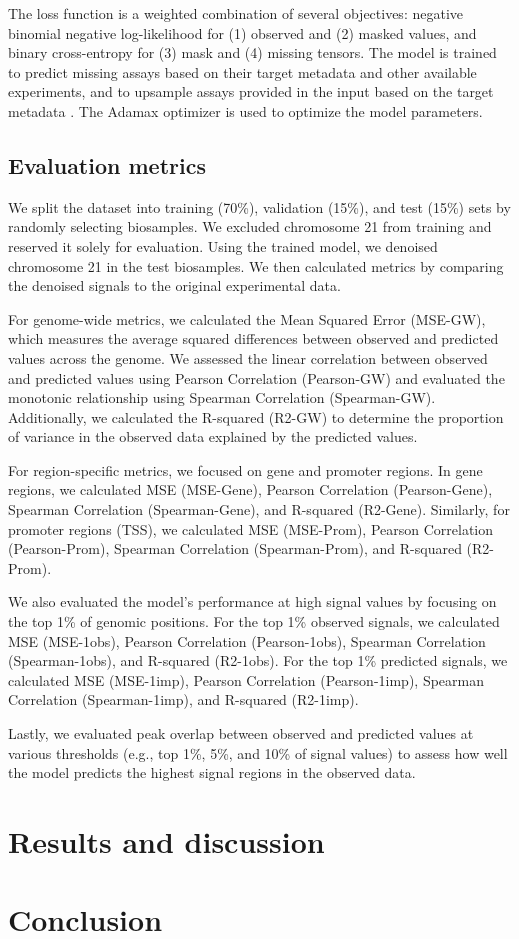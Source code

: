 \documentclass[twoside,11pt]{article}
\begin{document}
The loss function is a weighted combination of several objectives: negative binomial negative log-likelihood for (1) observed and (2) masked values, and binary cross-entropy for (3) mask and (4) missing tensors. The model is trained to predict missing assays based on their target metadata and other available experiments, and to upsample assays provided in the input based on the target metadata . The Adamax optimizer is used to optimize the model parameters.

\subsection{Evaluation metrics}

We split the dataset into training (70\%), validation (15\%), and test (15\%) sets by randomly selecting biosamples. We excluded chromosome 21 from training and reserved it solely for evaluation. Using the trained model, we denoised chromosome 21 in the test biosamples. We then calculated metrics by comparing the denoised signals to the original experimental data.

For genome-wide metrics, we calculated the Mean Squared Error (MSE-GW), which measures the average squared differences between observed and predicted values across the genome. We assessed the linear correlation between observed and predicted values using Pearson Correlation (Pearson-GW) and evaluated the monotonic relationship using Spearman Correlation (Spearman-GW). Additionally, we calculated the R-squared (R2-GW) to determine the proportion of variance in the observed data explained by the predicted values.

For region-specific metrics, we focused on gene and promoter regions. In gene regions, we calculated MSE (MSE-Gene), Pearson Correlation (Pearson-Gene), Spearman Correlation (Spearman-Gene), and R-squared (R2-Gene). Similarly, for promoter regions (TSS), we calculated MSE (MSE-Prom), Pearson Correlation (Pearson-Prom), Spearman Correlation (Spearman-Prom), and R-squared (R2-Prom).

We also evaluated the model's performance at high signal values by focusing on the top 1\% of genomic positions. For the top 1\% observed signals, we calculated MSE (MSE-1obs), Pearson Correlation (Pearson-1obs), Spearman Correlation (Spearman-1obs), and R-squared (R2-1obs). For the top 1\% predicted signals, we calculated MSE (MSE-1imp), Pearson Correlation (Pearson-1imp), Spearman Correlation (Spearman-1imp), and R-squared (R2-1imp).

Lastly, we evaluated peak overlap between observed and predicted values at various thresholds (e.g., top 1\%, 5\%, and 10\% of signal values) to assess how well the model predicts the highest signal regions in the observed data.

\section{Results and discussion}

\section{Conclusion}

\newpage


\end{document}
